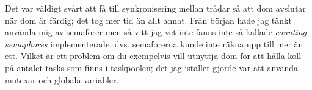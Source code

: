 Det var väldigt svårt att få till synkronisering mellan trådar så att dom avslutar när dom är färdig;
det tog mer tid än allt annat. Från början hade jag tänkt använda mig av semaforer men så vitt jag vet inte fanns inte så kallade \emph{counting semaphores} implementerade, dvs. semaforerna kunde inte räkna upp till mer än ett. Vilket är ett problem om du exempelvis vill utnyttja dom för att hålla koll på antalet tasks som finns i taskpoolen; det jag istället gjorde var att använda mutexar och globala variabler.